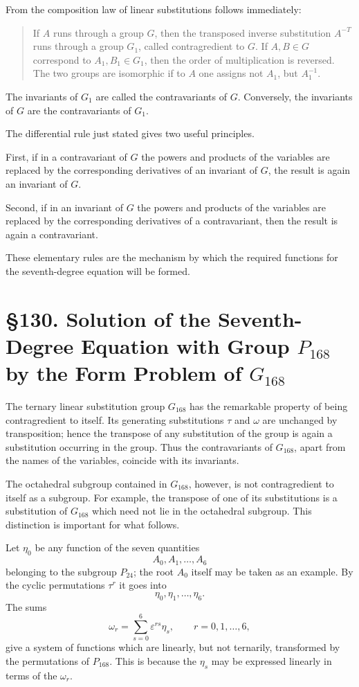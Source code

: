 \documentclass[12pt,a4paper]{article}
\newcommand{\webersection}[2]{\clearpage\section*{\S #1. #2}}
\newcommand{\eps}{\varepsilon}
\begin{document}
From the composition law of linear substitutions follows immediately:
\begin{quote}
If \(A\) runs through a group \(G\), then the transposed inverse substitution \(A^{-T}\) runs through a group \(G_1\), called contragredient to \(G\).  If \(A,B\in G\) correspond to \(A_1,B_1\in G_1\), then the order of multiplication is reversed.  The two groups are isomorphic if to \(A\) one assigns not \(A_1\), but \(A_1^{-1}\).
\end{quote}
The invariants of \(G_1\) are called the contravariants of \(G\).  Conversely, the invariants of \(G\) are the contravariants of \(G_1\).

The differential rule just stated gives two useful principles.

First, if in a contravariant of \(G\) the powers and products of the variables are replaced by the corresponding derivatives of an invariant of \(G\), the result is again an invariant of \(G\).

Second, if in an invariant of \(G\) the powers and products of the variables are replaced by the corresponding derivatives of a contravariant, then the result is again a contravariant.

These elementary rules are the mechanism by which the required functions for the seventh-degree equation will be formed.

\webersection{130}{Solution of the Seventh-Degree Equation with Group \(P_{168}\) by the Form Problem of \(G_{168}\)}

The ternary linear substitution group \(G_{168}\) has the remarkable property of being contragredient to itself.  Its generating substitutions \(\tau\) and \(\omega\) are unchanged by transposition; hence the transpose of any substitution of the group is again a substitution occurring in the group.  Thus the contravariants of \(G_{168}\), apart from the names of the variables, coincide with its invariants.

The octahedral subgroup contained in \(G_{168}\), however, is not contragredient to itself as a subgroup.  For example, the transpose of one of its substitutions is a substitution of \(G_{168}\) which need not lie in the octahedral subgroup.  This distinction is important for what follows.

Let \(\eta_0\) be any function of the seven quantities
\[
 A_0,A_1,\ldots,A_6
\]
belonging to the subgroup \(P_{24}\); the root \(A_0\) itself may be taken as an example.  By the cyclic permutations \(\tau^r\) it goes into
\[
 \eta_0,\eta_1,\ldots,\eta_6.
\]
The sums
\begin{equation}
 \omega_r=\sum_{s=0}^{6}\eps^{rs}\eta_s,
 \qquad r=0,1,\ldots,6, \tag{1}
\end{equation}
give a system of functions which are linearly, but not ternarily, transformed by the permutations of \(P_{168}\).  This is because the \(\eta_s\) may be expressed linearly in terms of the \(\omega_r\).
\end{document}
